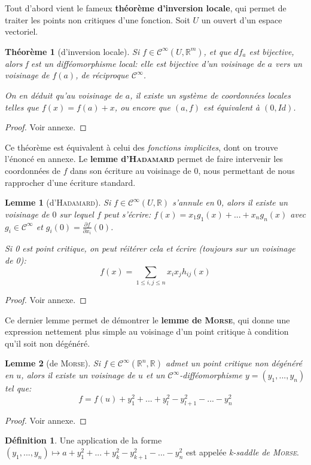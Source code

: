 \documentclass[a4paper]{article}
\newcommand{\cinf}{\mathcal{C}^\infty}
\newcommand{\R}{\mathbb{R}}
\newtheorem{thm}{Théorème}
\newtheorem{lemm}{Lemme}
\theoremstyle{definition}
\newtheorem{defn}{Définition}
\begin{document}
Tout d'abord vient le fameux \textbf{théorème d'inversion locale}, qui permet de traiter les points non critiques d'une fonction. Soit $U$ un ouvert d'un espace vectoriel.
\begin{thm}[d'inversion locale]
	Si $f\in\cinf(U,\R^m)$, et que $df_a$ est bijective, alors f est un difféomorphisme local: elle est bijective d'un voisinage de $a$ vers un voisinage de $f(a)$, de réciproque $\cinf$.

	On en déduit qu'au voisinage de $a$, il existe un système de coordonnées locales telles que $f(x)=f(a)+x$, ou encore que $(a,f)$ est équivalent à $(0,Id)$.
\end{thm}
\begin{proof} Voir annexe. \end{proof}

Ce théorème est équivalent à celui des \textit{fonctions implicites}, dont on trouve l'énoncé en annexe.
Le \textbf{lemme d'\textsc{Hadamard}} permet de faire intervenir les coordonnées de $f$ dans son écriture au voisinage de $0$, nous permettant de nous rapprocher d'une écriture standard.
\begin{lemm}[d'\textsc{Hadamard}]
	Si $f\in\cinf(U,\R)$ s'annule en $0$, alors il existe un voisinage de $0$ sur lequel $f$ peut s'écrire: $f(x)=x_1g_1(x)+...+x_ng_n(x)$ avec $g_i\in\cinf$ et $g_i(0) = \frac{\partial f}{\partial x_i}(0)$.

	Si 0 est point critique, on peut réitérer cela et écrire (toujours sur un voisinage de 0):
	$$f(x)=\sum_{1\leq i,j \leq n} x_ix_jh_{ij}(x)$$
\end{lemm}
\begin{proof} Voir annexe. \end{proof}

Ce dernier lemme permet de démontrer le \textbf{lemme de \textsc{Morse}}, qui donne une expression nettement plus simple au voisinage d'un point critique à condition qu'il soit non dégénéré.
\begin{lemm}[de \textsc{Morse}]
	Si $f\in\cinf(\R^n,\R)$ admet un point critique non dégénéré en $u$, alors il existe un voisinage de $u$ et un $\cinf$-difféomorphisme $y=(y_1,...,y_n)$ tel que:
	$$f=f(u)+y_1^2+...+y_l^2-y_{l+1}^2-...-y_n^2$$
\end{lemm}
\begin{proof} Voir annexe. \end{proof}
\begin{defn}
	Une application de la forme $(y_1,...,y_n)\mapsto a+y_1^2+...+y_k^2-y_{k+1}^2-...-y_n^2$ est appelée \textit{k-saddle de \textsc{Morse}}.
\end{defn}
\end{document}
